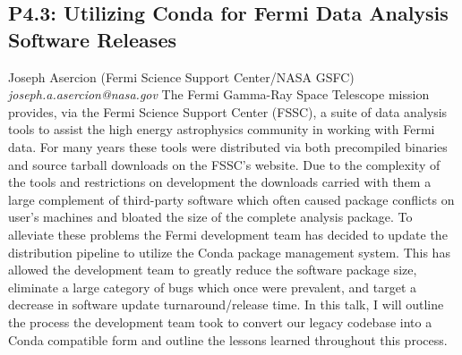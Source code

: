 \documentclass{report}
\begin{document}
\subsection*{P4.3: Utilizing Conda for Fermi Data Analysis Software Releases}
\bigskip
Joseph Asercion (Fermi Science Support Center/NASA GSFC) \newline   \newline   \newline   \newline  \newline  \newline\newline
{\it joseph.a.asercion@nasa.gov}\newline
\newline\newline
The Fermi Gamma-Ray Space Telescope mission provides, via the Fermi Science Support Center (FSSC), a suite of data analysis tools to assist the high energy astrophysics community in working with Fermi data.  For many years these tools were distributed via both precompiled binaries and source tarball downloads on the FSSC’s website.  Due to the complexity of the tools and restrictions on development the downloads carried with them a large complement of third-party software which often caused package conflicts on user’s machines and bloated the size of the complete analysis package.  To alleviate these problems the Fermi development team has decided to update the distribution pipeline to utilize the Conda package management system.  This has allowed the development team to greatly reduce the software package size, eliminate a large category of bugs which once were prevalent, and target a decrease in software update turnaround/release time.  In this talk, I will outline the process the development team took to convert our legacy codebase into a Conda compatible form and outline the lessons learned throughout this process.\newline
\newpage
\end{document}
